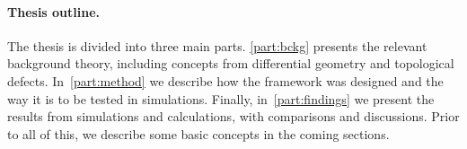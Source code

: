 








\paragraph{Thesis outline.} %
{%
The thesis is divided into three main parts. %
\cref{part:bckg} presents the relevant background theory, including concepts from differential geometry and topological defects. %
In~\cref{part:method} we describe how the framework was designed and the way it is to be tested in simulations. %
Finally, in~\cref{part:findings} we present the results from simulations and calculations, with comparisons and discussions. %
Prior to all of this, we describe some basic concepts in the coming sections.}










